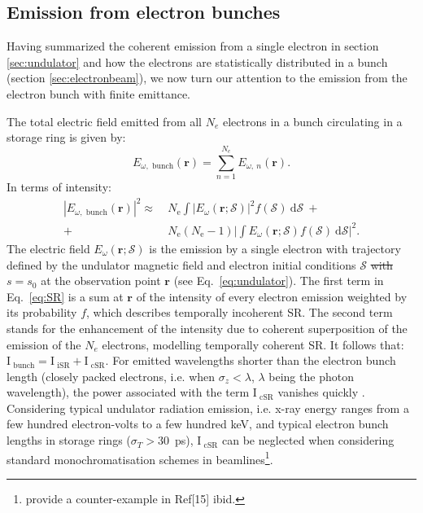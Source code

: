 \documentclass{iucr}              %
\newcommand{\remove}[1]{ {\color{blue} \sout{#1}}}
\begin{document}
\subsection{Emission from electron bunches}

Having summarized the coherent emission from a single electron in section \ref{sec:undulator} and how the electrons are statistically distributed in a bunch (section \ref{sec:electronbeam}), we now turn our attention to the emission from the electron bunch with finite emittance. %

The total electric field emitted from all $N_e$ electrons in a bunch circulating in a storage ring is given by: 
\begin{equation}
    E_{\omega,\text{~bunch}}(\textbf{r}) = \sum_{n=1}^{N_e} E_{\omega,~n}(\textbf{r}).
\end{equation}
In terms of intensity: 
\begin{equation}
\begin{split}
|E_{\omega,\text{~bunch}}(\textbf{r})|^2 \approx ~&N_\text{e} \int\big| E_\omega(\textbf{r};\mathcal{S})\big|^2 f(\mathcal{S})~ \text{d}\mathcal{S}~+\\
+~ &N_\text{e}(N_\text{e}-1)\bigg| \int E_\omega(\textbf{r};\mathcal{S}) f(\mathcal{S})~ \text{d}\mathcal{S} \bigg|^2.
\end{split}
\label{eq:SR}
\end{equation}
The electric field $E_\omega(\textbf{r};\mathcal{S})$ is the emission by a single electron with trajectory defined by the undulator magnetic field and electron initial conditions $\mathcal{S}$ \remove{with $s=s_0$} at the observation point $\textbf{r}$ (see Eq.~\ref{eq:undulator}). The first term in Eq.~\ref{eq:SR} is a sum at $\textbf{r}$ of the intensity of every electron emission weighted by its probability $f$, which describes temporally incoherent SR. The second term stands for the enhancement of the intensity due to coherent superposition of the emission of the $N_e$ electrons, modelling temporally coherent SR. It follows that: $\text{I}_\text{~bunch} = \text{I}_\text{~iSR}+\text{I}_\text{~cSR}$. For emitted wavelengths shorter than the electron bunch length (closely packed electrons, i.e. when $\sigma_z < \lambda$, $\lambda$ being the photon wavelength), the power associated with the term $\text{I}_\text{~cSR}$ vanishes quickly \cite{CSR,Wiedemann2015}. Considering typical undulator radiation emission, i.e. x-ray energy ranges from a few hundred electron-volts to a few hundred keV, and typical electron bunch lengths in storage rings ($\sigma_{T}>30$~ps), $\text{I}_\text{~cSR}$ can be neglected when considering standard monochromatisation schemes in beamlines\footnote{ provide a counter-example in Ref[15] ibid.}.
\end{document}
